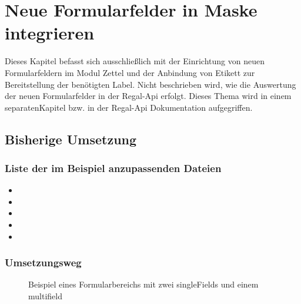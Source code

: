 \documentclass[letterpaper,10pt,ngerman]{sphinxmanual}
\begin{document}
\chapter{Neue Formularfelder in Maske integrieren}
\label{\detokenize{developer-docs/addForm:neue-formularfelder-in-maske-integrieren}}\label{\detokenize{developer-docs/addForm::doc}}
Dieses Kapitel befasst sich ausschließlich mit der Einrichtung von neuen Formularfeldern im Modul Zettel und der Anbindung von Etikett zur Bereitstellung der benötigten Label.
Nicht beschrieben wird, wie die Auswertung der neuen Formularfelder in der Regal-Api erfolgt. Dieses Thema wird in einem separatenKapitel bzw. in der Regal-Api Dokumentation aufgegriffen.


\section{Bisherige Umsetzung}
\label{\detokenize{developer-docs/addForm:bisherige-umsetzung}}

\subsection{Liste der im Beispiel anzupassenden Dateien}
\label{\detokenize{developer-docs/addForm:liste-der-im-beispiel-anzupassenden-dateien}}\begin{itemize}
\item {} 

\item {} 

\item {} 

\item {} 

\item {} 

\end{itemize}


\subsection{Umsetzungsweg}
\label{\detokenize{developer-docs/addForm:umsetzungsweg}}
\begin{figure}[htbp]
\centering
\capstart

\noindent{}
\caption{Beispiel eines Formularbereichs mit zwei singleFields und einem multifield}\label{\detokenize{developer-docs/addForm:id9}}\end{figure}
\end{document}
